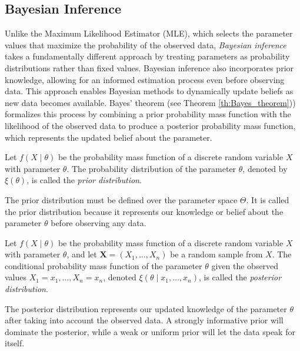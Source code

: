 
\subsection{Bayesian Inference}
\label{sec:bayesian_inference}

Unlike the Maximum Likelihood Estimator (MLE), which selects the parameter values that maximize the probability of the observed data, \emph{Bayesian inference} takes a fundamentally different approach by treating parameters as probability distributions rather than fixed values. Bayesian inference also incorporates prior knowledge, allowing for an informed estimation process even before observing data. This approach enables Bayesian methods to dynamically update beliefs as new data becomes available. Bayes' theorem (see Theorem \ref{th:Bayes_theorem})) formalizes this process by combining a prior probability mass function with the likelihood of the observed data to produce a posterior probability mass function, which represents the updated belief about the parameter.

\begin{definition}
Let $f\left(X \mid \theta \right)$ be the probability mass function of a discrete random variable $X$ with parameter $\theta$. The probability distribution of the parameter $\theta$, denoted by $\xi\left(\theta\right)$, is called the \emph{prior distribution}.
\end{definition}

The prior distribution must be defined over the parameter space $\Theta$. It is called the prior distribution because it represents our knowledge or belief about the parameter $\theta$ before observing any data.

\begin{definition}
Let $f\left(X \mid \theta \right)$ be the probability mass function of a discrete random variable $X$ with parameter $\theta$, and let $\mathbf{X}=\left(X_{1},\ldots,X_{n}\right)$ be a random sample from $X$. The conditional probability mass function of the parameter $\theta$ given the observed values $X_1 = x_1, \ldots, X_n = x_n$, denoted $\xi \left( \theta \mid x_1, \ldots, x_n \right)$, is called the \emph{posterior distribution}.
\end{definition}

The posterior distribution represents our updated knowledge of the parameter $\theta$ after taking into account the observed data. A strongly informative prior will dominate the posterior, while a weak or uniform prior will let the data speak for itself.

